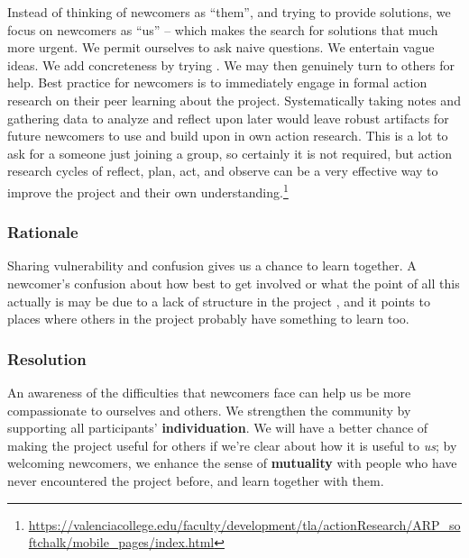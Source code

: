 Instead of thinking of newcomers as
``them'', and trying to provide solutions, we focus on newcomers as
``us'' -- which makes the search for solutions that much more urgent.
We permit ourselves to ask naive questions.  We entertain vague ideas.
We add concreteness by trying .  We may then genuinely turn
to others for help. 
Best practice for newcomers is to immediately engage in formal action research on their peer learning about the project. Systematically taking notes and gathering data to analyze and reflect upon later would leave robust artifacts for future newcomers to use and build upon in own action research. This is a lot to ask for a someone just joining a group, so certainly it is not required, but action research cycles of reflect, plan, act, and observe can be a very effective way to improve the project and their own understanding.\footnote{\url{https://valenciacollege.edu/faculty/development/tla/actionResearch/ARP_softchalk/mobile_pages/index.html}}

%
\subsubsection*{Rationale} 
%
Sharing vulnerability and confusion gives us a chance to learn
together.  A newcomer's confusion about how best to get involved or
what the point of all this actually is may be due to a lack of
structure in the project , and it points to
places where others in the project probably have something to learn too.
%

\subsubsection*{Resolution}
An awareness of the difficulties that newcomers face can
help us be more compassionate to ourselves and others.  We strengthen the community
by supporting all participants' \textbf{individuation}.  We will have a better chance of making
the project useful for others if we're clear about how it is useful to \emph{us}; by welcoming newcomers, we enhance the sense of \textbf{mutuality} with people who have never encountered the project before, and learn together with them.

